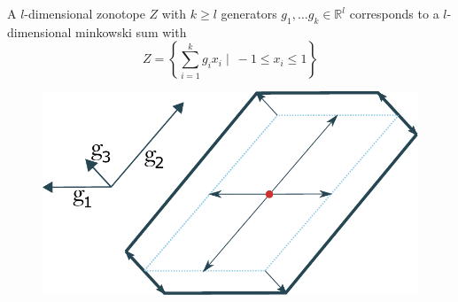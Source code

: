 \documentclass[
  a4paper,  %
  twoside,  %
  bibliography=totoc,
  headsepline,
  cleardoublepage=empty,
  parskip=half,
  draft=false
]{scrbook}
\begin{document}
\begin{definition}[Zonotopes]

A $l$-dimensional zonotope $Z$ with $k \geq l$ generators $g_1, \dots g_k \in \mathds{R}^l$ corresponds to a $l$-dimensional minkowski sum with 
\begin{equation}
Z=\left\{\sum_{i=1}^k g_i x_i \mid ~ -1 \leq x_i \leq 1\right\}
  \label{zonotope}
\end{equation}

\begin{figure}[H]
\centering
  \includegraphics[width=0.5\linewidth]{graphics/zonotope}
  \label{fig:zonotope}
\end{figure}

\end{definition}
\end{document}
